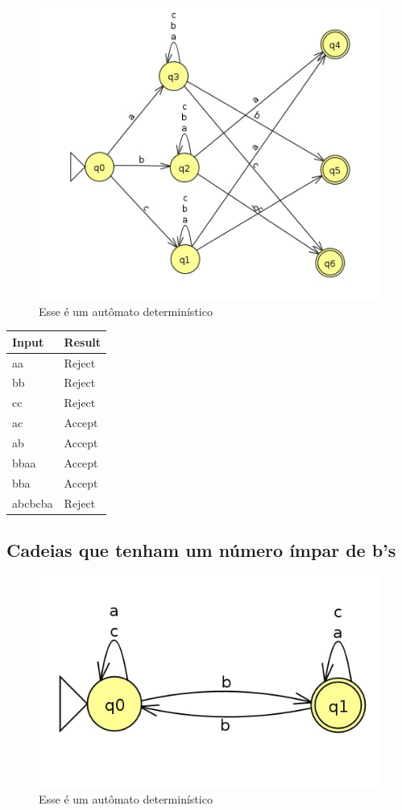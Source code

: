 \documentclass[11pt]{article}
\begin{document}
\begin{figure}[htbp]
\centering
\includegraphics[width=.9\linewidth]{./q1/f/q1f.jpg}
\caption{\label{fig:orga8b45d9}
Esse é um autômato determinístico}
\end{figure}

\begin{center}
\begin{tabular}{ll}
Input & Result\\
\hline
aa & Reject\\
bb & Reject\\
cc & Reject\\
ac & Accept\\
ab & Accept\\
bbaa & Accept\\
bba & Accept\\
abcbcba & Reject\\
\end{tabular}
\end{center}

\subsection{Cadeias que tenham um número ímpar de b’s}
\label{sec:org2e7d842}
\begin{figure}[htbp]
\centering
\includegraphics[width=.9\linewidth]{./q1/g/q1g.jpg}
\caption{\label{fig:org380876c}
Esse é um autômato determinístico}
\end{figure}
\end{document}
